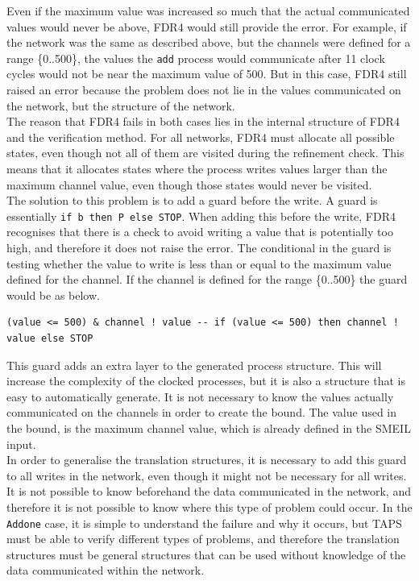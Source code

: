 Even if the maximum value was increased so much that the actual communicated values would never be above, FDR4 would still provide the error.
For example, if the network was the same as described above, but the channels were defined for a range \{0..500\}, the values the \texttt{add} process would communicate after 11 clock cycles would not be near the maximum value of 500. But in this case, FDR4 still raised an error because the problem does not lie in the values communicated on the network, but the structure of the network. \\

The reason that FDR4 fails in both cases lies in the internal structure of FDR4 and the verification method. For all networks, FDR4 must allocate all possible states, even though not all of them are visited during the refinement check. This means that it allocates states where the process writes values larger than the maximum channel value, even though those states would never be visited.\\

The solution to this problem is to add a guard before the write. A \cspm{} guard is essentially \texttt{if b then P else STOP}. When adding this before the write, FDR4 recognises that there is a check to avoid writing a value that is potentially too high, and therefore it does not raise the error. The conditional in the guard is testing whether the value to write is less than or equal to the maximum value defined for the channel. If the channel is defined for the range \{0..500\} the guard would be as below.
\begin{verbatim}
(value <= 500) & channel ! value -- if (value <= 500) then channel ! value else STOP
\end{verbatim}

This guard adds an extra layer to the generated process structure. This will increase the complexity of the clocked processes, but it is also a structure that is easy to automatically generate. It is not necessary to know the values actually communicated on the channels in order to create the bound. The value used in the bound, is the maximum channel value, which is already defined in the SMEIL input. \\

In order to generalise the translation structures, it is necessary to add this guard to all writes in the network, even though it might not be necessary for all writes. It is not possible to know beforehand the data communicated in the network, and therefore it is not possible to know where this type of problem could occur. In the \texttt{Addone} case, it is simple to understand the failure and why it occurs, but TAPS must be able to verify different types of problems, and therefore the translation structures must be general structures that can be used without knowledge of the data communicated within the network. \\

